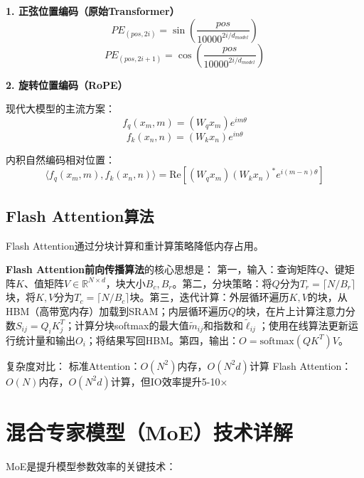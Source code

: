 \textbf{1. 正弦位置编码（原始Transformer）}
\begin{equation}
PE_{(pos, 2i)} = \sin\left(\frac{pos}{10000^{2i/d_{model}}}\right)
\end{equation}
\begin{equation}
PE_{(pos, 2i+1)} = \cos\left(\frac{pos}{10000^{2i/d_{model}}}\right)
\end{equation}

\textbf{2. 旋转位置编码（RoPE）}

现代大模型的主流方案\cite{su2024roformer}：
\begin{equation}
f_q(x_m, m) = (W_q x_m) e^{im\theta}
\end{equation}
\begin{equation}
f_k(x_n, n) = (W_k x_n) e^{in\theta}
\end{equation}

内积自然编码相对位置：
\begin{equation}
\langle f_q(x_m, m), f_k(x_n, n) \rangle = \text{Re}[(W_q x_m)(W_k x_n)^* e^{i(m-n)\theta}]
\end{equation}

\subsection{Flash Attention算法}

Flash Attention通过分块计算和重计算策略降低内存占用\cite{dao2023flashattention2}。

\textbf{Flash Attention前向传播算法}的核心思想是：
第一，输入：查询矩阵$Q$、键矩阵$K$、值矩阵$V \in \mathbb{R}^{N \times d}$，块大小$B_c, B_r$。第二，分块策略：将$Q$分为$T_r = \lceil N/B_r \rceil$块，将$K, V$分为$T_c = \lceil N/B_c \rceil$块。第三，迭代计算：外层循环遍历$K, V$的块，从HBM（高带宽内存）加载到SRAM；内层循环遍历$Q$的块，在片上计算注意力分数$S_{ij} = Q_i K_j^T$；计算分块softmax的最大值$\tilde{m}_{ij}$和指数和$\tilde{\ell}_{ij}$；使用在线算法更新运行统计量和输出$O_i$；将结果写回HBM。第四，输出：$O = \text{softmax}(QK^T)V$。

复杂度对比：
标准Attention：$O(N^2)$内存，$O(N^2d)$计算 Flash Attention：$O(N)$内存，$O(N^2d)$计算，但IO效率提升5-10×

\section{混合专家模型（MoE）技术详解}

MoE是提升模型参数效率的关键技术\cite{jiang2024mixtral, deepseek2024v2}：


